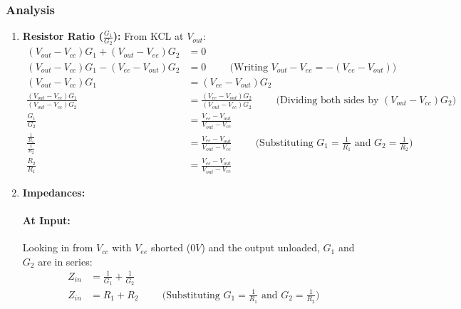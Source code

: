 \subsubsection{Analysis}
\begin{enumerate}
  \item \textbf{Resistor Ratio (\(\frac{G_1}{G_2}\)):}
    From KCL at \(V_{out}\):
    \begin{align*}
      (V_{out} - V_{cc})G_1 + (V_{out} - V_{ee})G_2 &= 0 \\
      (V_{out} - V_{cc})G_1 - (V_{ee} - V_{out})G_2 &= 0 \hspace{1cm} \text{(Writing \(V_{out} - V_{ee} = -(V_{ee} - V_{out})\))} \\
      (V_{out} - V_{cc})G_1 &= (V_{ee} - V_{out})G_2 \\
      \frac{(V_{out} - V_{cc})G_1}{(V_{out} - V_{cc})G_2} &= \frac{(V_{ee} - V_{out})G_2}{(V_{out} - V_{cc})G_2} \hspace{1cm} \text{(Dividing both sides by \((V_{out} - V_{cc})G_2\))} \\
      \frac{G_1}{G_2} &= \frac{V_{ee} - V_{out}}{V_{out} - V_{cc}} \\
      \frac{\frac{1}{R_1}}{\frac{1}{R_2}} &= \frac{V_{ee} - V_{out}}{V_{out} - V_{cc}} \hspace{1cm} \text{(Substituting \(G_1 = \frac{1}{R_1}\) and \(G_2 = \frac{1}{R_2}\))} \\
      \frac{R_2}{R_1} &= \frac{V_{ee} - V_{out}}{V_{out} - V_{cc}}
    \end{align*}
  \item \textbf{Impedances:}
    \paragraph{At Input:} Looking in from \(V_{cc}\) with \(V_{ee}\) shorted
    (\(0V\)) and the output unloaded, \(G_1\) and \(G_2\) are in series:
      \begin{align*}
        Z_{in} &= \frac{1}{G_1} + \frac{1}{G_2} \\
        Z_{in} &= R_1 + R_2 \hspace{1cm} \text{(Substituting \(G_1 = \frac{1}{R_1}\) and \(G_2 = \frac{1}{R_2}\))}
      \end{align*}

\end{enumerate}
